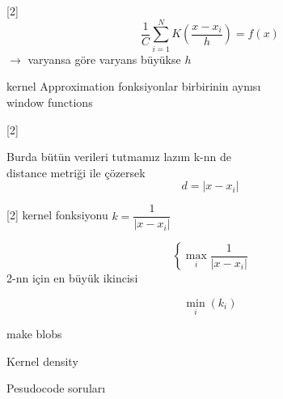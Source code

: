\documentclass[11pt,a4paper]{article}
\begin{document}
[2]
\[ \frac{1}{C}\sum_{i=1}^{N} K\!\left(\frac{x-x_i}{h}\right) = f(x) \]
$\rightarrow$ varyansa göre \qquad varyans büyükse $h$ 

kernel Approximation \qquad fonksiyonlar birbirinin aynısı \\
window functions

[2]

Burda bütün verileri tutmamız lazım k-nn de \\
distance metriği ile çözersek
\[ d = |x - x_i| \]

[2]
kernel fonksiyonu \quad $k = \dfrac{1}{|x-x_i|}$

\[ \left\{ \max_i \frac{1}{|x-x_i|} \right. \]
2-nn için en büyük ikincisi

\[ \min_i (k_i) \]

make blobs

Kernel density

Pesudocode soruları
\end{document}
